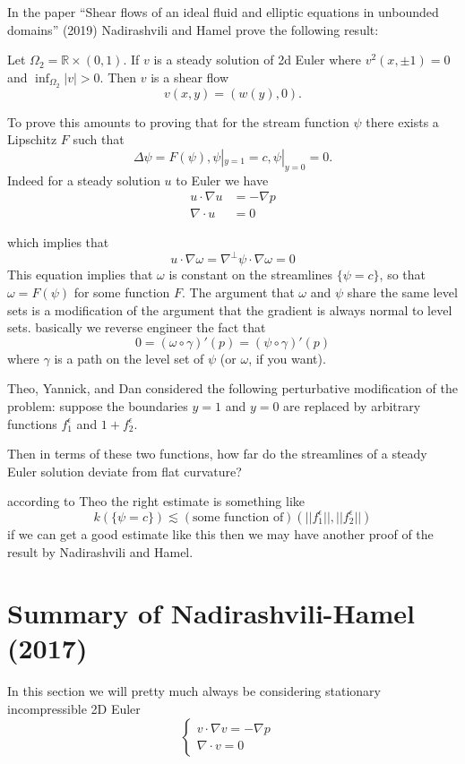In the paper ``Shear flows of an ideal fluid and elliptic equations in unbounded domains'' (2019) Nadirashvili and Hamel prove the following result:

\begin{theorem}
    Let $\Omega_2 = \mathbb{R} \times (0, 1)$. If $v$ is a steady solution of 2d Euler where $v^2(x, \pm 1) = 0$ and $\inf_{\Omega_2}|v| > 0$. Then $v$ is a shear flow
    \[v(x, y) = (w(y), 0).\]
\end{theorem}

To prove this amounts to proving that for the stream function $\psi$ there exists a Lipschitz $F$ such that 
\[\Delta \psi = F(\psi), \psi|_{y = 1} = c, \psi|_{y = 0} = 0.\] Indeed for a steady solution $u$ to Euler we have
\begin{align*}
    u \cdot \nabla u &= -\nabla p \\
    \nabla \cdot u &= 0
\end{align*}

which implies that 
\[u \cdot \nabla \omega = \nabla^{\perp}\psi \cdot \nabla \omega = 0\]
This equation implies that $\omega$ is constant on the streamlines $\{\psi = c\}$, so that $\omega = F(\psi)$ for some function $F$. The argument that $\omega$ and $\psi$ share the same level sets is a modification of the argument that the gradient is always normal to level sets. basically we reverse engineer the fact that 
\[0 = (\omega \circ \gamma)'(p) = (\psi \circ \gamma)'(p)\]
where $\gamma$ is a path on the level set of $\psi$ (or $\omega$, if you want).

Theo, Yannick, and Dan considered the following perturbative modification of the problem: suppose the boundaries $y = 1$ and $y = 0$ are replaced by arbitrary functions $f_1^\epsilon$ and $1 + f_2^\epsilon$.

Then in terms of these two functions, how far do the streamlines of a steady Euler solution deviate from flat curvature?

according to Theo the right estimate is something like
\[k(\{\psi = c\}) \lesssim (\text{some function of})(||f_1^\epsilon||, ||f_2^\epsilon||)\]
if we can get a good estimate like this then we may have another proof of the result by Nadirashvili and Hamel.

\section{Summary of Nadirashvili-Hamel (2017)}

In this section we will pretty much always be considering stationary incompressible 2D Euler 
\[\begin{cases}
    v \cdot \nabla v = -\nabla p & \\
    \nabla \cdot v = 0 & 
\end{cases}\]

